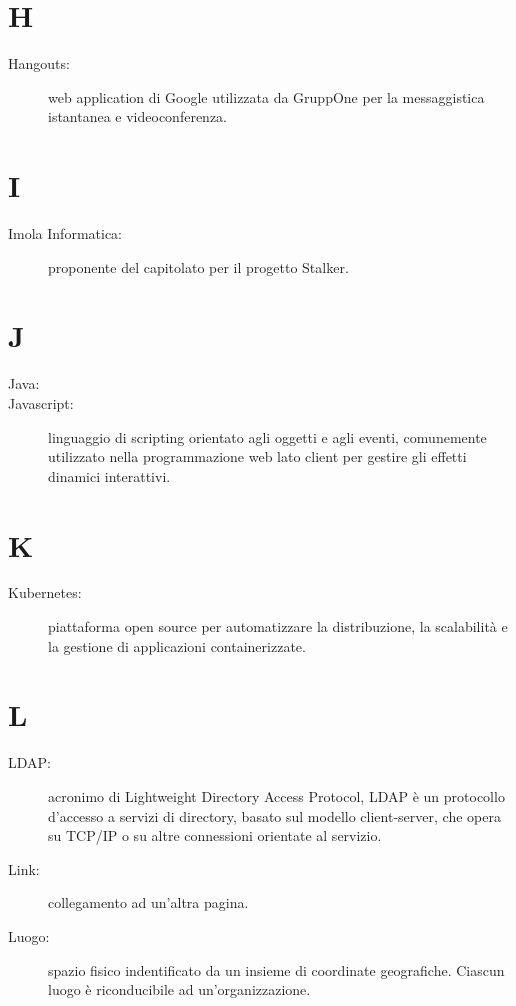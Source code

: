 \documentclass{article}
\begin{document}
	\section{H}
	\begin{description}
		\item[Hangouts:] web application di Google utilizzata da GruppOne per la messaggistica istantanea e videoconferenza.
	\end{description}
	\newpage
	\section{I}
	\begin{description}
		\item[Imola Informatica:] proponente del capitolato per il progetto Stalker.
	\end{description}
	\newpage
	\section{J}
	\begin{description}
		\item[Java:] 
		\item[Javascript:] linguaggio di scripting orientato agli oggetti e agli eventi, comunemente utilizzato nella programmazione web lato client per gestire gli effetti dinamici interattivi.
	\end{description}
	\newpage
	\section{K}
	\begin{description}
		\item[Kubernetes:] piattaforma open source per automatizzare la distribuzione, la scalabilità e la gestione di applicazioni containerizzate.
	\end{description}
	\newpage
	\section{L}
	\begin{description}
		\item[LDAP:] acronimo di Lightweight Directory Access Protocol, LDAP è un protocollo d'accesso a servizi di directory, basato sul modello client-server, che opera su TCP/IP o su altre connessioni orientate al servizio.
		\item[Link:] collegamento ad un'altra pagina.
		\item[Luogo:] spazio fisico indentificato da un insieme di coordinate geografiche. Ciascun luogo è riconducibile ad un'organizzazione.
	\end{description}
	\newpage
\end{document}
